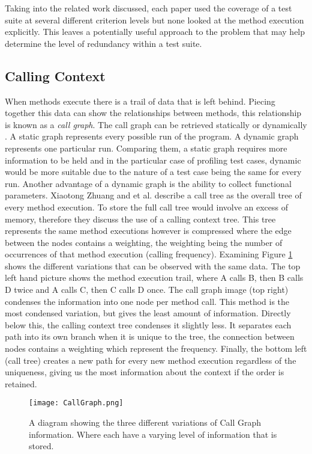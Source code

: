 Taking into the related work discussed, each paper used the coverage of a test suite at several different criterion levels but none looked at the method execution explicitly. This leaves a potentially useful approach to the problem that may help determine the level of redundancy within a test suite. 
\subsection{Calling Context}
When methods execute there is a trail of data that is left behind. Piecing together this data can show the relationships between methods, this relationship is known as a \textit{call graph}. The call graph can be retrieved statically or dynamically \cite{graham1982gprof}. A static graph represents every possible run of the program. A dynamic graph represents one particular run. Comparing them, a static graph requires more information to be held and in the particular case of profiling test cases, dynamic would be more suitable due to the nature of a test case being the same for every run. Another advantage of a dynamic graph is the ability to collect functional parameters. Xiaotong Zhuang and et al. \cite{Zhuang06accurate} describe a call tree as the overall tree of every method execution. To store the full call tree would involve an excess of memory, therefore they discuss the use of a calling context tree. This tree represents the same method executions however is compressed where the edge between the nodes contains a weighting, the weighting being the number of occurrences of that method execution (calling frequency). Examining Figure \ref{fig:callgraph} shows the different variations that can be observed with the same data. The top left hand picture shows the method execution trail, where A calls B, then B calls D twice and A calls C, then C calls D once. The call graph image (top right) condenses the information into one node per method call. This method is the most condensed variation, but gives the least amount of information. Directly below this, the calling context tree condenses it slightly less. It separates each path into its own branch when it is unique to the tree, the connection between nodes contains a weighting which represent the frequency. Finally, the bottom left (call tree) creates a new path for every new method execution regardless of the uniqueness, giving us the most information about the context if the order is retained.

\begin{figure}[h]
\begin{center}
\texttt{[image: CallGraph.png]}
\end{center}
\caption{A diagram showing the three different variations of Call Graph information. Where  each have a varying level of information that is stored.}
\label{fig:callgraph}
\end{figure}

